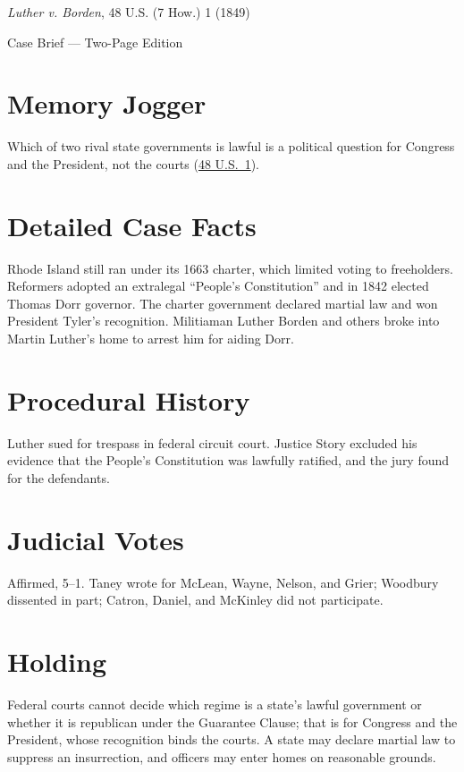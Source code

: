 \documentclass[12pt]{article}
\begin{document}
\begin{center}
{\LARGE \textit{Luther v. Borden}, 48 U.S. (7 How.) 1 (1849)\par}
\vspace{0.5em}
{\large Case Brief --- Two-Page Edition\par}
\end{center}

\section{Memory Jogger}
Which of two rival state governments is lawful is a political question for Congress and the President, not the courts (\href{https://supreme.justia.com/cases/federal/us/48/1/}{48 U.S.\ 1}).

\section{Detailed Case Facts}
Rhode Island still ran under its 1663 charter, which limited voting to freeholders. Reformers adopted an extralegal ``People's Constitution'' and in 1842 elected Thomas Dorr governor. The charter government declared martial law and won President Tyler's recognition. Militiaman Luther Borden and others broke into Martin Luther's home to arrest him for aiding Dorr.

\section{Procedural History}
Luther sued for trespass in federal circuit court. Justice Story excluded his evidence that the People's Constitution was lawfully ratified, and the jury found for the defendants.

\section{Judicial Votes}
Affirmed, 5--1. Taney wrote for McLean, Wayne, Nelson, and Grier; Woodbury dissented in part; Catron, Daniel, and McKinley did not participate.

\section{Holding}
Federal courts cannot decide which regime is a state's lawful government or whether it is republican under the Guarantee Clause; that is for Congress and the President, whose recognition binds the courts. A state may declare martial law to suppress an insurrection, and officers may enter homes on reasonable grounds.
\end{document}
